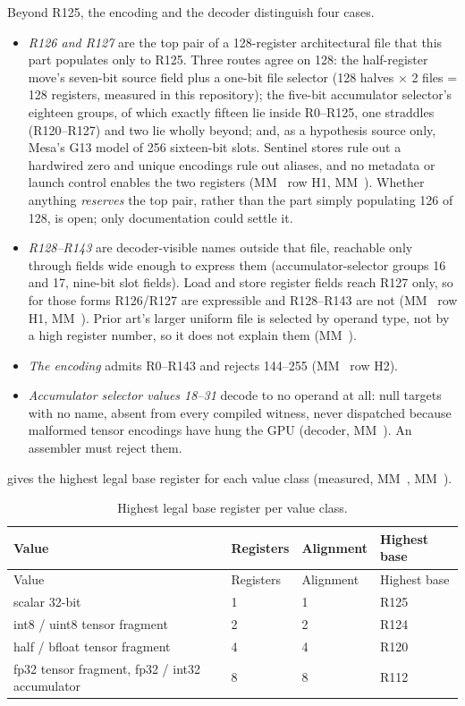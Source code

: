 Beyond R125, the encoding and the decoder distinguish four cases.

\begin{itemize}
\item \emph{R126 and R127} are the top pair of a 128-register architectural file that this part populates only to R125. Three
  routes agree on 128: the half-register move's seven-bit source field plus a one-bit file selector (128 halves × 2
  files = 128 registers, measured in this repository); the five-bit accumulator selector's eighteen groups, of which
  exactly fifteen lie inside R0–R125, one straddles (R120–R127) and two lie wholly beyond; and, as a hypothesis source
  only, Mesa's G13 model of 256 sixteen-bit slots. Sentinel stores rule out a hardwired zero and unique encodings rule
  out aliases, and no metadata or launch control enables the two registers (MM~ row H1, MM~). Whether anything \emph{reserves} the
  top pair, rather than the part simply populating 126 of 128, is open; only documentation could settle it.
\item \emph{R128–R143} are decoder-visible names outside that file, reachable only through fields wide enough to express them
  (accumulator-selector groups 16 and 17, nine-bit slot fields). Load and store register fields reach R127 only, so for
  those forms R126/R127 are expressible and R128–R143 are not (MM~ row H1, MM~). Prior art's larger uniform file
  is selected by operand type, not by a high register number, so it does not explain them (MM~).
\item \emph{The encoding} admits R0–R143 and rejects 144–255 (MM~ row H2).
\item \emph{Accumulator selector values 18–31} decode to no operand at all: null targets with no name, absent from every
  compiled witness, never dispatched because malformed tensor encodings have hung the GPU (decoder, MM~). An
  assembler must reject them.
\end{itemize}

 gives the highest legal base register for each value class (measured, MM~, MM~).

\begin{xltabular}{\linewidth}{@{}Xlll@{}}
\caption{Highest legal base register per value class.}\label{tab:highest-base}\\
\toprule
Value & Registers & Alignment & Highest base \\
\midrule
\endfirsthead
{}
\toprule
Value & Registers & Alignment & Highest base \\
\midrule
\endhead
scalar 32-bit & 1 & 1 & R125 \\*
int8 / uint8 tensor fragment & 2 & 2 & R124 \\*
half / bfloat tensor fragment & 4 & 4 & R120 \\*
fp32 tensor fragment, fp32 / int32 accumulator & 8 & 8 & R112 \\*
\bottomrule
\end{xltabular}

